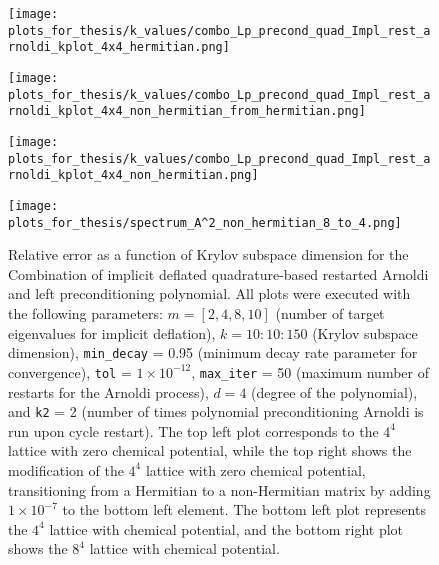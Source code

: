 \begin{figure}[H]
    \centering
    \begin{minipage}{0.45\textwidth}
        \centering
        \texttt{[image: plots\_for\_thesis/k\_values/combo\_Lp\_precond\_quad\_Impl\_rest\_arnoldi\_kplot\_4x4\_hermitian.png]} %
    \end{minipage}%
    \hspace{0.02\textwidth} %
    \begin{minipage}{0.45\textwidth}
        \centering
        \texttt{[image: plots\_for\_thesis/k\_values/combo\_Lp\_precond\_quad\_Impl\_rest\_arnoldi\_kplot\_4x4\_non\_hermitian\_from\_hermitian.png]} %
    \end{minipage}
    
    \vspace{0.02\textwidth} %
    
    \begin{minipage}{0.45\textwidth}
        \centering
        \texttt{[image: plots\_for\_thesis/k\_values/combo\_Lp\_precond\_quad\_Impl\_rest\_arnoldi\_kplot\_4x4\_non\_hermitian.png]} %
    \end{minipage}%
    \hspace{0.02\textwidth} %
    \begin{minipage}{0.45\textwidth}
        \centering
        \texttt{[image: plots\_for\_thesis/spectrum\_A^2\_non\_hermitian\_8\_to\_4.png]} %
    \end{minipage}
    
    \caption{\small Relative error as a function of Krylov subspace dimension for the Combination of implicit deflated quadrature-based restarted Arnoldi and left preconditioning polynomial. All plots were executed with the following parameters: $m = [2, 4, 8, 10]$ (number of target eigenvalues for implicit deflation), $k = 10:10:150$ (Krylov subspace dimension), \texttt{min\_decay} = 0.95 (minimum decay rate parameter for convergence), \texttt{tol} = $1 \times 10^{-12}$, \texttt{max\_iter} = 50 (maximum number of restarts for the Arnoldi process), $d = 4$ (degree of the polynomial), and \texttt{k2} = 2 (number of times polynomial preconditioning Arnoldi is run upon cycle restart). The top left plot corresponds to the $4^4$ lattice with zero chemical potential, while the top right shows the modification of the $4^4$ lattice with zero chemical potential, transitioning from a Hermitian to a non-Hermitian matrix by adding $1 \times 10^{-7}$ to the bottom left element. The bottom left plot represents the $4^4$ lattice with chemical potential, and the bottom right plot shows the $8^4$ lattice with chemical potential.}
    \label{fig:combo_imp_rest_arnoldi+left_precond_k_plot}
\end{figure}

